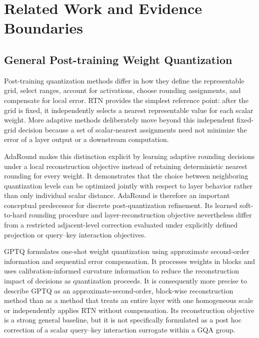 \section{Related Work and Evidence Boundaries}

\subsection{General Post-training Weight Quantization}

Post-training quantization methods differ in how they define the representable grid, select ranges, account for activations, choose rounding assignments, and compensate for local error. RTN provides the simplest reference point: after the grid is fixed, it independently selects a nearest representable value for each scalar weight. More adaptive methods deliberately move beyond this independent fixed-grid decision because a set of scalar-nearest assignments need not minimize the error of a layer output or a downstream computation.

AdaRound \cite{nagel2020adaround} makes this distinction explicit by learning adaptive rounding decisions under a local reconstruction objective instead of retaining deterministic nearest rounding for every weight. It demonstrates that the choice between neighboring quantization levels can be optimized jointly with respect to layer behavior rather than only individual scalar distance. AdaRound is therefore an important conceptual predecessor for discrete post-quantization refinement. Its learned soft-to-hard rounding procedure and layer-reconstruction objective nevertheless differ from a restricted adjacent-level correction evaluated under explicitly defined projection or query--key interaction objectives.

GPTQ \cite{frantar2022gptq} formulates one-shot weight quantization using approximate second-order information and sequential error compensation. It processes weights in blocks and uses calibration-informed curvature information to reduce the reconstruction impact of decisions as quantization proceeds. It is consequently more precise to describe GPTQ as an approximate-second-order, block-wise reconstruction method than as a method that treats an entire layer with one homogeneous scale or independently applies RTN without compensation. Its reconstruction objective is a strong general baseline, but it is not specifically formulated as a post hoc correction of a scalar query--key interaction surrogate within a GQA group.

